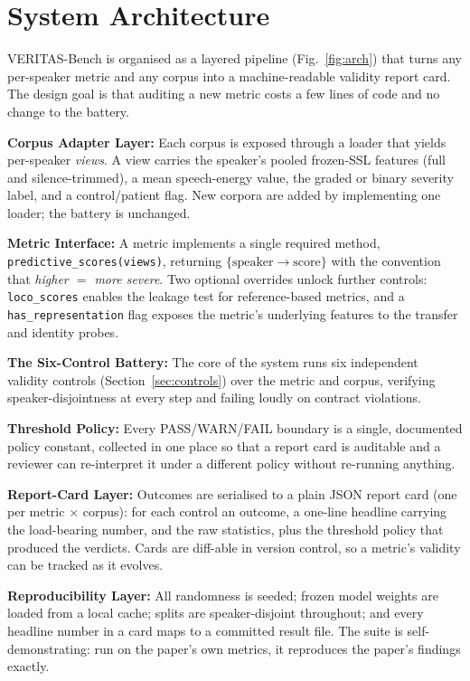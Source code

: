 \documentclass[runningheads]{llncs}
\begin{document}
\section{System Architecture}
VERITAS-Bench is organised as a layered pipeline (Fig.~\ref{fig:arch}) that turns
any per-speaker metric and any corpus into a machine-readable validity report
card. The design goal is that auditing a new metric costs a few lines of code and
no change to the battery.

\textbf{Corpus Adapter Layer:} Each corpus is exposed through a loader that yields
per-speaker \emph{views}. A view carries the speaker's pooled frozen-SSL features
(full and silence-trimmed), a mean speech-energy value, the graded or binary
severity label, and a control/patient flag. New corpora are added by implementing
one loader; the battery is unchanged.

\textbf{Metric Interface:} A metric implements a single required method,
\texttt{predictive\_scores(views)}, returning $\{\text{speaker}\rightarrow
\text{score}\}$ with the convention that \emph{higher $=$ more severe}. Two
optional overrides unlock further controls: \texttt{loco\_scores} enables the
leakage test for reference-based metrics, and a \texttt{has\_representation} flag
exposes the metric's underlying features to the transfer and identity probes.

\textbf{The Six-Control Battery:} The core of the system runs six independent
validity controls (Section~\ref{sec:controls}) over the metric and corpus,
verifying speaker-disjointness at every step and failing loudly on contract
violations.

\textbf{Threshold Policy:} Every PASS/WARN/FAIL boundary is a single, documented
policy constant, collected in one place so that a report card is auditable and a
reviewer can re-interpret it under a different policy without re-running anything.

\textbf{Report-Card Layer:} Outcomes are serialised to a plain JSON report card
(one per metric $\times$ corpus): for each control an outcome, a one-line headline
carrying the load-bearing number, and the raw statistics, plus the threshold
policy that produced the verdicts. Cards are diff-able in version control, so a
metric's validity can be tracked as it evolves.

\textbf{Reproducibility Layer:} All randomness is seeded; frozen model weights are
loaded from a local cache; splits are speaker-disjoint throughout; and every
headline number in a card maps to a committed result file. The suite is
self-demonstrating: run on the paper's own metrics, it reproduces the paper's
findings exactly.
\end{document}
